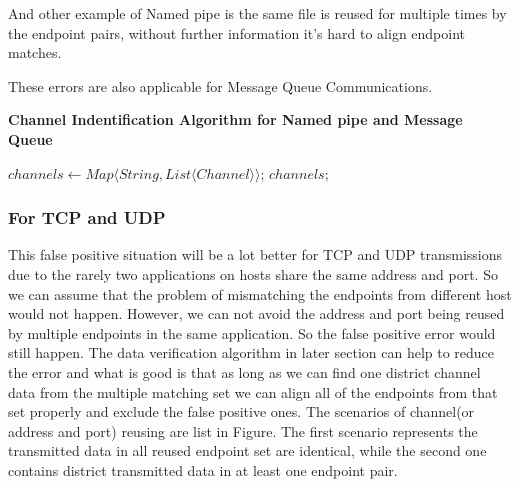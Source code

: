 And other example of Named pipe is the same file is reused for multiple times by the endpoint pairs, without further information it's hard to align endpoint matches.

These errors are also applicable for Message Queue Communications.

\begin{algorithm}[H]
\DontPrintSemicolon
\caption{{\bf Channel Indentification Algorithm for Named pipe and Message Queue} \label{channelAlg1}}
$channels \leftarrow Map \langle String, List \langle Channel \rangle \rangle$;\; 
\KwRet $channels$;\;
\end{algorithm} 

\subsubsection{For TCP and UDP}
This false positive situation will be a lot better for TCP and UDP transmissions due to the rarely two applications on hosts share the same address and port. So we can assume that the problem of mismatching the endpoints from different host would not happen. However, we can not avoid the address and port being reused by multiple endpoints in the same application. So the false positive error would still happen. The data verification algorithm in later section can help to reduce the error and what is good is that as long as we can find one district channel data from the multiple matching set we can align all of the endpoints from that set properly and exclude the false positive ones. The scenarios of channel(or address and port) reusing are list in Figure. The first scenario represents the transmitted data in all reused endpoint set are identical, while the second one contains district transmitted data in at least one endpoint pair.

